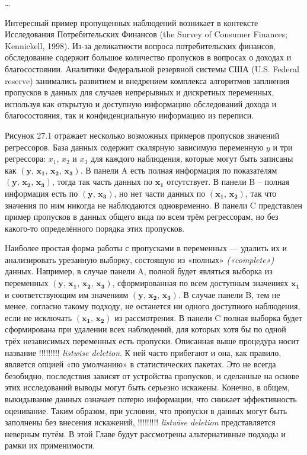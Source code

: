 …

Интересный пример пропущенных наблюдений возникает в контексте Исследования Потребительских Финансов (the Survey of Consumer Finances; Kennickell, 1998). Из-за деликатности вопроса потребительских финансов, обследование содержит большое количество пропусков в вопросах о доходах и благосостоянии. Аналитики Федеральной резервной системы США (U.S. Federal reserve) занимались развитием и внедрением комплекса алгоритмов заплнения пропусков в данных для случаев непрерывных и дискретных переменных, используя как открытую и доступную информацию обследований дохода и благосостояния, так и конфиденциальную информацию из переписи.

Рисунок 27.1 отражает несколько возможных примеров пропусков значений регрессоров. База данных содержит скалярную зависимую переменную $y$ и три регрессора: $x_1$, $x_2$ и $x_3$ для каждого наблюдения, которые могут быть записаны как $(\mathbf{y, \, x_1, \, x_2, \, x_3})$. В панели A есть полная информация по показателям $(\mathbf{y, \, x_2, \, x_3})$, тогда так часть данных по $\mathbf{x_1}$ отсутствует. В панели B – полная информация есть по $(\mathbf{y, \, x_3})$, но нет части данных по $(\mathbf{x_1, \, x_2})$, так что значения по ним никогда не наблюдаются одновременно. В панели C представлен пример пропусков в данных общего вида по всем трём  регрессорам, но без какого-то определённого порядка этих пропусков.  

Наиболее простая форма работы с пропусками в переменных --– удалить их и анализировать урезанную выборку, состоящую из «полных» \emph{(«complete»)} данных. Например, в случае панели A, полной будет являться выборка из переменных $(\mathbf{y, \, x_1, \, x_2, \, x_3})$, сформированная по всем доступным значениях $\mathbf{x_1}$ и соответствующим им значениям $(\mathbf{y, \, x_2, \, x_3})$. В случае панели B, тем не менее, согласно такому подходу, не останется ни одного доступного наблюдения, если не исключать $(\mathbf{x_1, \, x_2})$ из рассмотрения. В панели C полная выборка будет сформирована при удалении всех наблюдений, для которых хотя бы по одной трёх независимых переменных есть пропуски.
Описанная выше процедура носит название !!!!!!!!! \emph{listwise deletion}. К ней часто прибегают и она, как правило, является опцией «по умолчанию» в статистических пакетах. Это не всегда безобидно, последствия зависят от устройства пропусков, и сделанные на основе этих исследований выводы могут быть серьезно искажены. Конечно, в общем, выкидывание данных означает потерю информации, что снижает эффективность оценивание. Таким образом, при условии, что пропуски в данных могут быть заполнены без внесения искажений, !!!!!!!!! \emph{listwise deletion} представляется неверным путём. В этой Главе будут рассмотрены альтернативные подходы и рамки их применимости.

